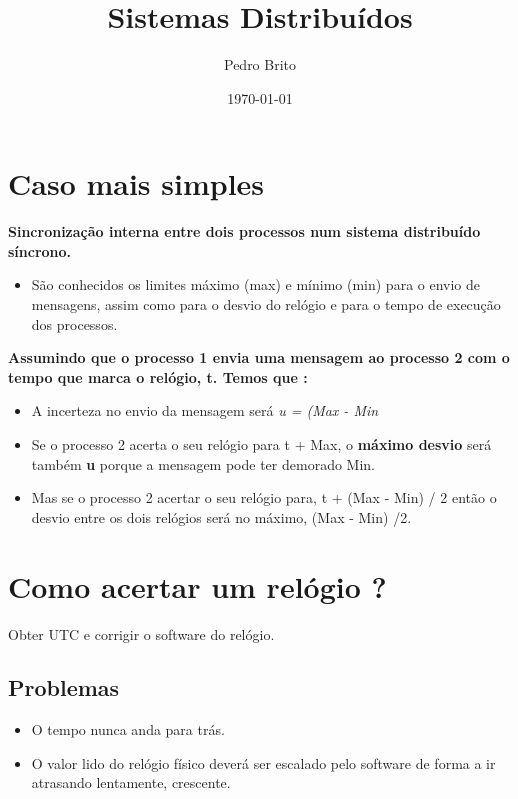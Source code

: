 \documentclass{article}
\date{\today \\ \currenttime}
\title{Sistemas Distribuídos}
\author{Pedro Brito}
\begin{document}
\maketitle

\section{Caso mais simples}

\textbf{Sincronização interna entre dois processos num sistema distribuído síncrono.}


\begin{itemize}
    \item São conhecidos os limites máximo (max) e mínimo (min) para o envio de mensagens, assim como para o desvio do relógio e para o tempo de execução dos processos.
\end{itemize}



\textbf{Assumindo que o processo 1 envia uma mensagem ao processo 2 com o tempo que marca o relógio, t. Temos que : }


\begin{itemize}
    \item A incerteza no envio da mensagem será \textit{u = (Max - Min}
    
    
    \item Se o processo 2 acerta o seu relógio para t + Max, o \textbf{máximo desvio} será também \textbf{u} porque a mensagem pode ter demorado Min.
    
    
    
    \item Mas se o processo 2 acertar o seu relógio para, t + (Max - Min) / 2 então o desvio entre os dois relógios será no máximo, (Max - Min) /2.
\end{itemize}



\section{Como acertar um relógio ? }

Obter UTC e corrigir o software do relógio.



\subsection{Problemas}


\begin{itemize}
    \item O tempo nunca anda para trás.
    \item O valor lido do relógio físico deverá ser escalado pelo software de forma a ir atrasando lentamente, crescente.
    
\end{itemize}
\end{document}
